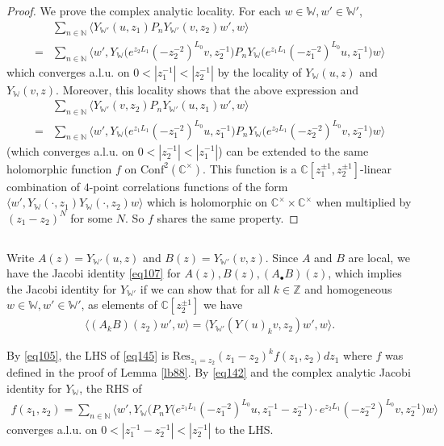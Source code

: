 \documentclass[11pt,b5paper,notitlepage]{article}
\theoremstyle{definition}
\theoremstyle{plain}
\newcommand{\Conf}{\mathrm{Conf}}
\newcommand{\Res}{\mathrm{Res}}
\newcommand{\bk}[1]{\langle {#1}\rangle}
\newcommand{\bigbk}[1]{\big\langle {#1}\big\rangle}
\newcommand{\blt}{\bullet}
\newcommand{\Wbb}{\mathbb W}
\newcommand{\Cbb}{\mathbb C}
\newcommand{\Nbb}{\mathbb N}
\newcommand{\Zbb}{\mathbb Z}
\numberwithin{equation}{section}
\begin{document}
\begin{proof}
We prove the complex analytic locality. For each $w\in\Wbb,w'\in\Wbb'$,
\begin{align}
&\sum_{n\in\Nbb}\bigbk{Y_{\Wbb'}(u,z_1)P_nY_{\Wbb'}(v,z_2)w',w}\\
=&\sum_{n\in\Nbb}\bigbk{w',Y_\Wbb\big(e^{z_2L_1}(-z_2^{-2})^{L_0}v,z_2^{-1}\big)P_nY_\Wbb\big(e^{z_1L_1}(-z_1^{-2})^{L_0}u,z_1^{-1}\big)w}
\end{align}
which converges a.l.u. on $0<|z_1^{-1}|<|z_2^{-1}|$ by the locality of $Y_{\Wbb}(u,z)$ and $Y_{\Wbb}(v,z)$. Moreover, this locality shows that the above expression and 
\begin{align}
&\sum_{n\in\Nbb}\bigbk{Y_{\Wbb'}(v,z_2)P_nY_{\Wbb'}(u,z_1)w',w}\\
=&\sum_{n\in\Nbb}\bigbk{w',Y_\Wbb\big(e^{z_1L_1}(-z_1^{-2})^{L_0}u,z_1^{-1}\big)P_n Y_\Wbb\big(e^{z_2L_1}(-z_2^{-2})^{L_0}v,z_2^{-1}\big)w}\label{eq142}
\end{align}
(which converges a.l.u. on $0<|z_2^{-1}|<|z_1^{-1}|$) can be extended to the same holomorphic function $f$ on $\Conf^2(\Cbb^\times)$. This function is a $\Cbb[z_1^{\pm1},z_2^{\pm1}]$-linear combination of $4$-point correlations functions of the form $\bk{w',Y_\Wbb(\cdot,z_1)Y_{\Wbb}(\cdot,z_2)w}$ which is holomorphic on $\Cbb^\times\times\Cbb^\times$ when multiplied by $(z_1-z_2)^N$ for some $N$. So $f$ shares the same property. 
\end{proof}




\subsection{}

Write $A(z)=Y_{\Wbb'}(u,z)$ and $B(z)=Y_{\Wbb'}(v,z)$. Since $A$ and $B$ are local,  we have the Jacobi identity \eqref{eq107} for $A(z),B(z),(A_\blt B)(z)$, which implies the Jacobi identity for $Y_{\Wbb'}$ if we can show that for all $k\in\Zbb$ and homogeneous $w\in\Wbb,w'\in\Wbb'$, as elements of $\Cbb[z_2^{\pm1}]$ we have
\begin{align}
\bigbk{(A_kB)(z_2)w',w}=\bigbk{Y_{\Wbb'}(Y(u)_kv,z_2)w',w}.	\label{eq145}
\end{align}


By \eqref{eq105}, the LHS of \eqref{eq145} is $\Res_{z_1=z_2}(z_1-z_2)^kf(z_1,z_2)dz_1$ where $f$ was defined in the proof of Lemma \ref{lb88}. By \eqref{eq142} and the complex analytic Jacobi identity for $Y_\Wbb$,  the RHS of
\begin{align}
f(z_1,z_2)=	\sum_{n\in\Nbb}\bigbk{w', Y_\Wbb\big(P_nY\big(e^{z_1L_1}(-z_1^{-2})^{L_0}u,z_1^{-1}-z_2^{-1}\big)\cdot e^{z_2L_1}(-z_2^{-2})^{L_0}v,z_2^{-1}\big)w}\label{eq143}
\end{align}
converges a.l.u. on $0<|z_1^{-1}-z_2^{-1}|<|z_2^{-1}|$ to the LHS. 
\end{document}
